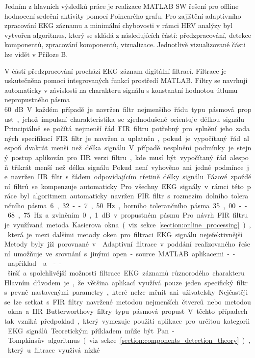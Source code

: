 Jedním z hlavních výsledků práce je realizace MATLAB SW řešení pro offline
hodnocení srdeční aktivity pomocí Poincarého grafu. Pro zajištění adaptivního
zpracování EKG záznamu a minimální chybovosti v rámci HRV analýzy byl vytvořen
algoritmus, který se skládá z následujících částí: předzpracování, detekce
komponentů, zpracování komponentů, vizualizace. Jednotlivě vizualizované části
lze vidět v Příloze B.

V částí předzpracování prochází EKG záznam digitální filtrací. Filtrace je
uskutečněna pomocí integrovaných funkcí prostředí MATLAB. Filtry se
navrhují automaticky v závislosti na charakteru signálu s konstantní hodnotou
útlumu nepropustného pásma 60~\si\dB. V každém případě je navržen filtr
nejmenšího řádu typu pásmová propust, jehož impulsní charakteristika se
zjednodušeně orientuje délkou signálu. Principiálně se počítá nejmenší řád FIR
filtru potřebný pro splnění jeho zadaných specifikací. FIR filtr je navržen a
uplatněn, pokud je vypočítaný řád alespoň dvakrát menší než délka signálu. V
případě nesplnění podmínky je stejný postup aplikován pro IIR verzi filtru, kde
musí být vypočítaný řád alespoň třikrát menší než délka signálu. Pokud není
vyhověno ani jedné podmínce je navržen IIR filtr s řádem odpovídajícím třetině
délky signálu. Fázové zpoždění filtrů se kompenzuje automaticky. Pro všechny EKG
signály v rámci této práce byl algoritmem automaticky navržen FIR filtr s
rozmezím dolního tolerančního pásma 6,32--7,50~\si\Hz, horního tolerančního
pásma 35,00--68,75~\si\Hz~a zvlněním 0,1~\si\dB~v propustném pásmu. Pro návrh
FIR filtru je využívaná metoda Kasierova okna (viz
sekce~\ref{section:online_processing}), která je mezi dalšími metody oken pro
filtraci EKG signálu nejefektivnější. Metody byly již porovnané v
\cite{Kumar2014,Lakhwani2013,Yadav2011}. Adaptivní filtrace v poddání
realizovaného řešení umožňuje ve srovnání s jinými open-source MATLAB
aplikacemi -- například~\cite{ecgkit}~a~\cite{Sedghamiz2018} -- širší a
spolehlivější možnosti filtrace EKG záznamů různorodého charakteru. Hlavním
důvodem je, že většina aplikací využívá pouze jeden specifický filtr s pevně
nastavenými parametry, které nelze měnit ani uživatelsky. Nejčastěji se lze
setkat s FIR filtry navržené metodou nejmenších čtverců nebo metodou okna a IIR
Butterworthovy filtry typu pásmová propust. V těchto případech tak vzniká
předpoklad, který vymezuje použití aplikace pro určitou kategorii EKG signálů.
Teoretickým příkladem může být Pan-Tompkinsův algoritmus (viz
sekce~\ref{section:components_detection_theory}), který u filtrace využívá nízké
